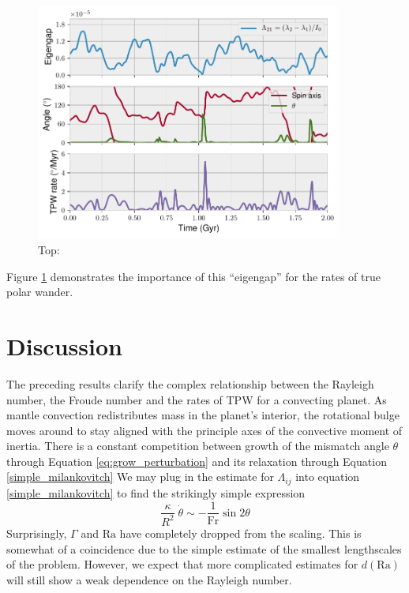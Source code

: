 \documentclass[extra,onecolumn]{gji}
\begin{document}
\begin{figure}
\centering
\label{misfit}
\includegraphics[width=0.9\textwidth]{figures/misfit.pdf}
\caption{Top: }
\end{figure}

Figure \ref{misfit} demonstrates the importance of this ``eigengap'' for the rates of true polar wander.  


\section{Discussion}

The preceding results clarify the complex relationship between the Rayleigh number, the Froude number and the rates of TPW for a convecting planet.
As mantle convection redistributes mass in the planet's interior, the rotational bulge moves around to stay aligned with the principle axes of the convective moment of inertia. 
There is a constant competition between growth of the mismatch angle $\theta$ through Equation \ref{eq:grow_perturbation} and its relaxation through Equation \ref{simple_milankovitch}
We may plug in the estimate for $\Lambda_{ij}$ into equation \ref{simple_milankovitch} to find the strikingly simple expression
\begin{equation}
\frac{\kappa}{R^2} \; \dot{\theta} \sim -\frac{1}{\mathrm{Fr}} \sin{2 \theta}
\label{eq:simplest_milankovitch}
\end{equation}
Surprisingly, $\Gamma$ and $\mathrm{Ra}$ have completely dropped from the scaling. 
This is somewhat of a coincidence due to the simple estimate of the smallest lengthscales of the problem.
However, we expect that more complicated estimates for $d(\mathrm{Ra})$ will still show a weak dependence on the Rayleigh number.
\end{document}
